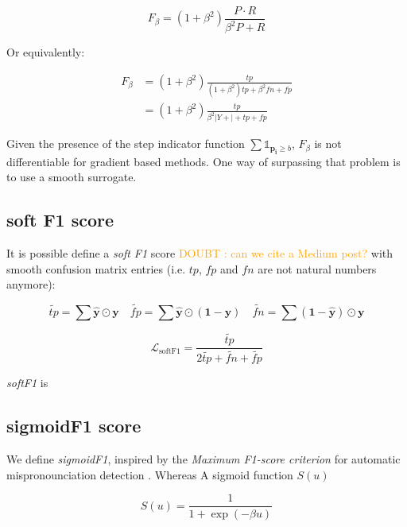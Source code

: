 \documentclass[sigconf,natbib,screen=true,review=true,anonymous]{acmart}
\newcommand\doubt[1]{\textcolor{orange}{DOUBT : #1}}
\begin{document}
\begin{equation}
F_{\beta}=\left(1+\beta^{2}\right) \frac{P \cdot R}{\beta^{2} P+R}
\end{equation}

Or equivalently:

\begin{equation}
\begin{aligned} F_{\beta} &=\left(1+\beta^{2}\right) \frac{t p}{\left(1+\beta^{2}\right) t p+\beta^{2} f n+f p} \\ &=\left(1+\beta^{2}\right) \frac{t p}{\beta^{2}|Y+|+t p+f p} \end{aligned}
\end{equation}

Given the presence of the step indicator function \(\sum \mathds{1}_{\mathbf{p_i} \geq b}\), \(F_\beta\) is not differentiable for gradient based methods. One way of surpassing that problem is to use a smooth surrogate.

\subsection{soft F1 score}
\label{sec:org0604bae}

It is possible define a \emph{soft F1} score \cite{softF1} \doubt{can we cite a Medium post?} with smooth confusion matrix entries (i.e. \(tp\), \(fp\) and \(fn\) are not natural numbers anymore):

$$
\tilde{tp}=\sum \hat{\mathbf{y}} \odot \mathbf{y} \quad \tilde{fp} = \sum \hat{\mathbf{y}} \odot (\mathbf{1}- \mathbf{y}) \quad \tilde{fn} = \sum (\mathbf{1} - \hat{\mathbf{y}}) \odot \mathbf{y}
$$

\begin{equation}
\mathcal{L}_{\text {softF1}}= \frac{\tilde{tp}}{2 \tilde{tp}+ \tilde{fn}+ \tilde{fp}}
\end{equation}

\emph{softF1} is 

\subsection{sigmoidF1 score}
\label{sec:org83b3ba5}

We define \emph{sigmoidF1}, inspired by the \emph{Maximum F1-score criterion} for automatic mispronounciation detection \cite{sigmoid}. Whereas 
A sigmoid function \(S(u)\)

\begin{equation}
S(u)=\frac{1}{1+\exp (-\beta u)}
\end{equation}
\end{document}
